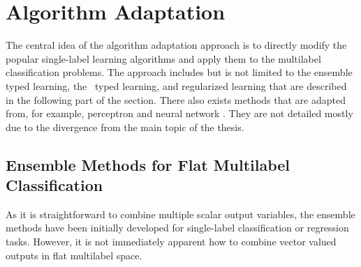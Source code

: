 {%
%
\section{Algorithm Adaptation}

The central idea of the algorithm adaptation approach is to directly modify the popular single-label learning algorithms and apply them to the multilabel classification problems.
The approach includes but is not limited to the ensemble typed learning, the \lr\ typed learning, and regularized learning that are described in the following part of the section.
There also exists methods that are adapted from, for example, perceptron \citep{Crammer03afamily} and neural network \citep{Zhang06multilabel}.
They are not detailed mostly due to the divergence from the main topic of the thesis.



%
%
\subsection{Ensemble Methods for Flat Multilabel Classification} \label{sc_emfmlc}

As it is straightforward to combine multiple scalar output variables, the ensemble methods have been initially developed for single-label classification \citep{Breiman96bagging,Freund97a} or regression  \citep{Breiman96bagging} tasks.
However, it is not immediately apparent how to combine vector valued outputs in flat multilabel space.

}
